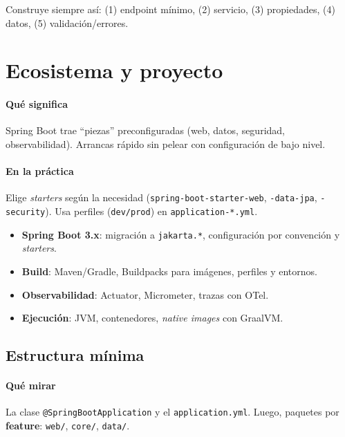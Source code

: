 \documentclass[11pt,a4paper]{article}
\begin{document}
\begin{tipbox}
Construye siempre así: (1) endpoint mínimo, (2) servicio, (3) propiedades, (4) datos, (5) validación/errores.
\end{tipbox}


\section{Ecosistema y proyecto}
\paragraph{Qué significa}
Spring Boot trae “piezas” preconfiguradas (web, datos, seguridad, observabilidad). Arrancas rápido sin pelear con configuración de bajo nivel.
\paragraph{En la práctica}
Elige \emph{starters} según la necesidad (\texttt{spring-boot-starter-web}, \texttt{-data-jpa}, \texttt{-security}). Usa perfiles (\texttt{dev/prod}) en \texttt{application-*.yml}.

\begin{itemize}[leftmargin=*]
  \item \textbf{Spring Boot 3.x}: migración a \texttt{jakarta.*}, configuración por convención y \emph{starters}.\
  \item \textbf{Build}: Maven/Gradle, Buildpacks para imágenes, perfiles y entornos.\
  \item \textbf{Observabilidad}: Actuator, Micrometer, trazas con OTel.\
  \item \textbf{Ejecución}: JVM, contenedores, \emph{native images} con GraalVM.
\end{itemize}

\subsection{Estructura mínima}
\paragraph{Qué mirar}
La clase \texttt{@SpringBootApplication} y el \texttt{application.yml}. Luego, paquetes por \textbf{feature}: \texttt{web/}, \texttt{core/}, \texttt{data/}.
\end{document}
